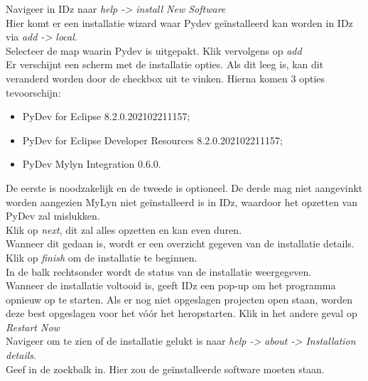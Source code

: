 Navigeer in IDz naar \textit{help -> install New Software}  \\

Hier komt er een installatie wizard waar Pydev geïnstalleerd kan worden in IDz via \textit{add -> local}. \\

Selecteer de map waarin Pydev is uitgepakt. Klik vervolgens op \textit{add} \\

Er verschijnt een scherm met de installatie opties. Als dit leeg is, kan dit veranderd worden door de checkbox  uit te vinken. Hierna komen 3 opties tevoorschijn:

\begin{itemize}
    \item PyDev for Eclipse 8.2.0.202102211157;
    \item PyDev for Eclipse Developer Resources 8.2.0.202102211157;
    \item PyDev Mylyn Integration 0.6.0.
\end{itemize}

De eerste is noodzakelijk en de tweede is optioneel. De derde mag niet aangevinkt worden aangezien MyLyn niet geïnstalleerd is in IDz, waardoor het opzetten van PyDev zal mislukken. \\ 

Klik op \textit{next}, dit zal alles opzetten en kan even duren. \\

Wanneer dit gedaan is, wordt er een overzicht gegeven van de installatie details. Klik op \textit{finish} om de installatie te beginnen. \\

In de balk rechtsonder wordt de status van de installatie weergegeven. \\

Wanneer de installatie voltooid is, geeft IDz een pop-up om het programma opnieuw op te starten. Als er nog niet opgeslagen projecten open staan, worden deze best opgeslagen voor het vóór het heropstarten. Klik in het andere geval op \textit{Restart Now} \\ 

Navigeer om te zien of de installatie gelukt is naar \textit{help -> about -> Installation details}. \\

Geef in de zoekbalk  in. Hier zou de geïnstalleerde software moeten staan. \\ 


